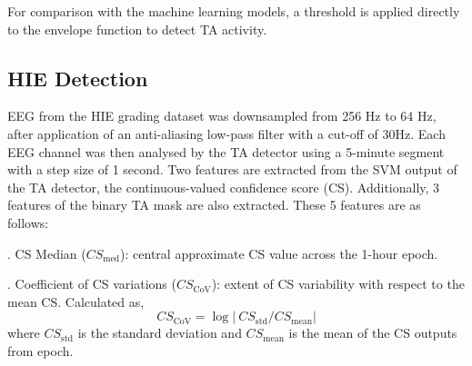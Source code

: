 \documentclass[conference]{IEEEtran}
\begin{document}
For comparison with the machine learning models, a threshold is applied directly to the envelope function to detect TA activity. 

\subsection{HIE Detection}
EEG from the HIE grading dataset was downsampled from 256 Hz to 64 Hz, after application of an anti-aliasing low-pass filter with a cut-off of 30Hz. Each EEG channel was then analysed by the TA detector using a 5-minute segment with a step size of 1 second. 
Two features are extracted from the SVM output of the TA detector, the continuous-valued confidence score (CS). Additionally, 3 features of the binary TA mask are also extracted. These 5 features are as follows:

\vspace{0.10cm}
. CS Median ($CS_{\text{med}}$): central approximate CS value across the 1-hour epoch.

\vspace{0.10cm}
. Coefficient of CS variations ($CS_{\text{CoV}}$): extent of CS variability with respect to the mean CS. Calculated as,
\begin{equation} CS_{\text{CoV}} = \log \left|~CS_{\text{std}} / CS_{\text{mean}}\right| \end{equation}
where $CS_{\text{std}}$ is the standard deviation and $CS_{\text{mean}}$ is the mean of the CS outputs from epoch.

\end{document}
